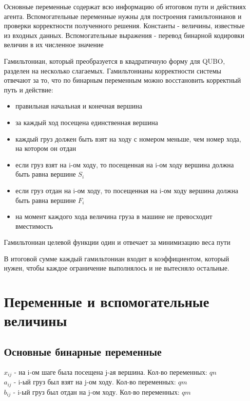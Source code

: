 \documentclass{article}
\begin{document}
Основные переменные содержат всю информацию об итоговом пути и действиях агента. Вспомогательные переменные нужны для построения гамильтонианов и проверки корректности полученного решения. Константы - величины, известные из входных данных. Вспомогательные выражения - перевод бинарной кодировки величин в их численное значение \par

Гамильтониан, который преобразуется в квадратичную форму для QUBO, разделен на несколько слагаемых. Гамильтонианы корректности системы отвечают за то, что по бинарным переменным можно восстановить корректный путь и действие:
\begin{itemize}
    \item правильная начальная и конечная вершина
    \item за каждый ход посещена единственная вершина
    \item каждый груз должен быть взят на ходу с номером меньше, чем номер хода, на котором он отдан
    \item если груз взят на i-ом ходу, то посещенная на i-ом ходу вершина должна быть равна вершине $S_i$
    \item если груз отдан на i-ом ходу, то посещенная на i-ом ходу вершина должна быть равна вершине $F_i$
    \item на момент каждого хода величина груза в машине не превосходит вместимость


\end{itemize}
Гамильтониан целевой функции один и отвечает за минимизацию веса пути\par

В итоговой сумме каждый гамильтониан входит в коэффициентом, который нужен, чтобы каждое ограничение выполнялось и не вытесняло остальные.




\section{Переменные и вспомогательные величины}


\subsection{Основные бинарные переменные}
$x_{ij}$ - на i-ом шаге была посещена j-ая вершина. Кол-во переменных: \(qn\)\\
$a_{ij}$ - i-ый груз был взят на j-ом ходу. Кол-во переменных: \(qm\) \\
$b_{ij}$ - i-ый груз был отдан на j-ом ходу. Кол-во переменных: \(qm\)
\end{document}
